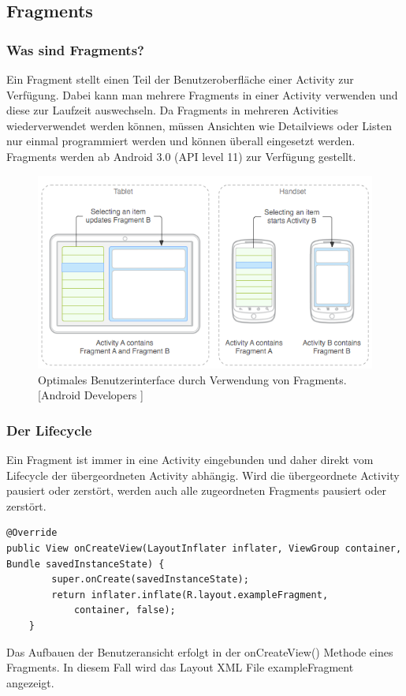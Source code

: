 \documentclass[FIPLY_base.tex]{subfiles}
\begin{document}
\subsection{Fragments}
\subsubsection{Was sind Fragments?}
Ein Fragment stellt einen Teil der Benutzeroberfläche einer Activity zur Verfügung. Dabei kann man mehrere Fragments in einer Activity verwenden und diese zur Laufzeit auswechseln.
Da Fragments in mehreren Activities wiederverwendet werden können, müssen Ansichten wie Detailviews oder Listen nur einmal programmiert werden und können überall eingesetzt werden.
Fragments werden ab Android 3.0 (API level 11) zur Verfügung gestellt. 

\begin{figure}[H]
\includegraphics[scale=0.60]{img/fragments_modules}
\caption{Optimales Benutzerinterface durch Verwendung von Fragments. 
[Android Developers \cite{adFragmentsGuide}]}
\end{figure}

\subsubsection{Der Lifecycle}
Ein Fragment ist immer in eine Activity eingebunden und daher direkt vom Lifecycle der übergeordneten Activity abhängig.
Wird die übergeordnete Activity pausiert oder zerstört, werden auch alle zugeordneten Fragments pausiert oder zerstört. 

\begin{lstlisting}[caption={onCreateView() das ein Fragment anzeigt},label=DescriptiveLabel]
@Override
public View onCreateView(LayoutInflater inflater, ViewGroup container, Bundle savedInstanceState) {
        super.onCreate(savedInstanceState);
        return inflater.inflate(R.layout.exampleFragment, 
        	container, false);
    }
\end{lstlisting}
Das Aufbauen der Benutzeransicht erfolgt in der onCreateView() Methode eines Fragments. In diesem Fall wird das Layout XML File exampleFragment angezeigt.
\end{document}
